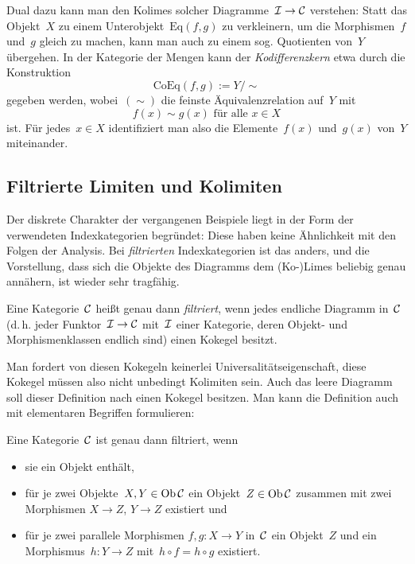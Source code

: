 Dual dazu kann man den Kolimes solcher Diagramme~$\mathcal{I} \to \mathcal{C}$ verstehen: Statt
das Objekt~$X$ zu einem Unterobjekt~$\mathrm{Eq}(f,g)$ zu verkleinern, um die
Morphismen~$f$ und~$g$ gleich zu machen, kann man auch zu einem sog. Quotienten
von~$Y$ übergehen. In der Kategorie der Mengen kann der \emph{Kodifferenzkern}
etwa durch die Konstruktion
\[ \mathrm{CoEq}(f,g) := Y/{\sim} \]
gegeben werden, wobei~$({\sim})$ die feinste Äquivalenzrelation auf~$Y$ mit
\[ \text{$f(x) \sim g(x)$ für alle~$x \in X$} \]
ist. Für jedes~$x \in X$ identifiziert man also die Elemente~$f(x)$ und~$g(x)$
von~$Y$ miteinander.


\subsection{Filtrierte Limiten und Kolimiten}

Der diskrete Charakter der vergangenen Beispiele liegt in der Form der
verwendeten Indexkategorien begründet: Diese haben keine Ähnlichkeit mit den
Folgen der Analysis. Bei \emph{filtrierten} Indexkategorien ist das anders, und
die Vorstellung, dass sich die Objekte des Diagramms dem (Ko-)Limes beliebig
genau annähern, ist wieder sehr tragfähig.

\begin{defn}Eine Kategorie~$\mathcal{C}$ heißt genau dann \emph{filtriert}, wenn jedes
endliche Diagramm in~$\mathcal{C}$ (d.\,h. jeder Funktor~$\mathcal{I} \to \mathcal{C}$ mit~$\mathcal{I}$ einer
Kategorie, deren Objekt- und Morphismenklassen endlich sind) einen Kokegel
besitzt.\end{defn}
Man fordert von diesen Kokegeln keinerlei Universalitätseigenschaft, diese
Kokegel müssen also nicht unbedingt Kolimiten sein. Auch das leere Diagramm
soll dieser Definition nach einen Kokegel besitzen. Man kann die Definition
auch mit elementaren Begriffen formulieren:

\begin{prop}\label{charakterisierungfiltriert}%
Eine Kategorie~$\mathcal{C}$ ist genau dann filtriert, wenn
\begin{itemize}
\item sie ein Objekt enthält,
\item für je zwei Objekte~$X,Y\in\operatorname{Ob}\mathcal{C}$ ein Objekt~$Z\in\operatorname{Ob}\mathcal{C}$ zusammen mit
zwei Morphismen $X \to Z$, $Y \to Z$ existiert und
\item für je zwei parallele Morphismen $f, g : X \to Y$ in~$\mathcal{C}$ ein Objekt~$Z$
und ein Morphismus~$h : Y \to Z$ mit~$h \circ f = h \circ g$ existiert.
\end{itemize}
\end{prop}

